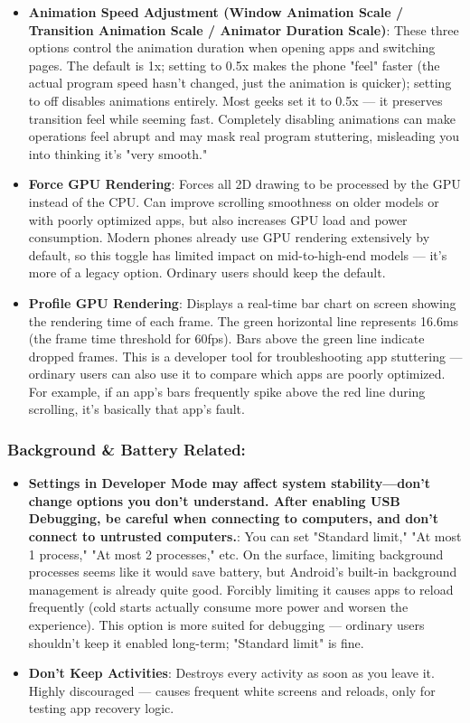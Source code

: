 \begin{itemize}
  \item \textbf{Animation Speed Adjustment (Window Animation Scale / Transition Animation Scale / Animator Duration Scale)}: These three options control the animation duration when opening apps and switching pages. The default is 1x; setting to 0.5x makes the phone "feel" faster (the actual program speed hasn't changed, just the animation is quicker); setting to off disables animations entirely. Most geeks set it to 0.5x — it preserves transition feel while seeming fast. Completely disabling animations can make operations feel abrupt and may mask real program stuttering, misleading you into thinking it's "very smooth."
  \item \textbf{Force GPU Rendering}: Forces all 2D drawing to be processed by the GPU instead of the CPU. Can improve scrolling smoothness on older models or with poorly optimized apps, but also increases GPU load and power consumption. Modern phones already use GPU rendering extensively by default, so this toggle has limited impact on mid-to-high-end models — it's more of a legacy option. Ordinary users should keep the default.
  \item \textbf{Profile GPU Rendering}: Displays a real-time bar chart on screen showing the rendering time of each frame. The green horizontal line represents 16.6ms (the frame time threshold for 60fps). Bars above the green line indicate dropped frames. This is a developer tool for troubleshooting app stuttering — ordinary users can also use it to compare which apps are poorly optimized. For example, if an app's bars frequently spike above the red line during scrolling, it's basically that app's fault.
\end{itemize}

\subsubsection*{Background \& Battery Related:}

\begin{itemize}
  \item \textbf{Settings in Developer Mode may affect system stability—don't change options you don't understand. After enabling USB Debugging, be careful when connecting to computers, and don't connect to untrusted computers.}: You can set "Standard limit," "At most 1 process," "At most 2 processes," etc. On the surface, limiting background processes seems like it would save battery, but Android's built-in background management is already quite good. Forcibly limiting it causes apps to reload frequently (cold starts actually consume more power and worsen the experience). This option is more suited for debugging — ordinary users shouldn't keep it enabled long-term; "Standard limit" is fine.
  \item \textbf{Don't Keep Activities}: Destroys every activity as soon as you leave it. Highly discouraged — causes frequent white screens and reloads, only for testing app recovery logic.
\end{itemize}


